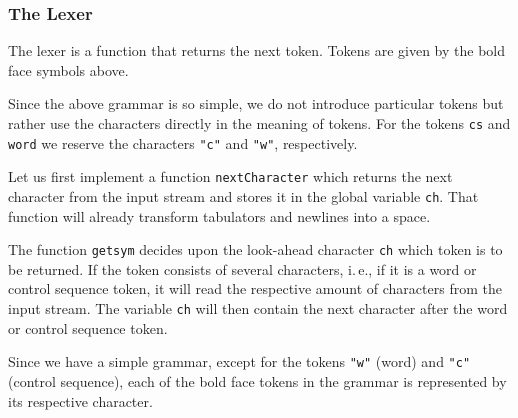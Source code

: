 \documentclass[a4paper]{article} %
\newcommand{\ie}{i.\,e.}
\begin{document}
\subsubsection{The Lexer}
The lexer is a function that returns the next token. Tokens are given
by the bold face symbols above.

Since the above grammar is so simple, we do not introduce particular
tokens but rather use the characters directly in the meaning of
tokens. For the tokens \texttt{cs} and \texttt{word} we reserve the
characters \texttt{"c"} and \texttt{"w"}, respectively.

Let us first implement a function \texttt{nextCharacter} which returns
the next character from the input stream and stores it in the global
variable \texttt{ch}. That function will already transform tabulators and
newlines into a space.


The function \texttt{getsym} decides upon the look-ahead character
\texttt{ch} which token is to be returned. If the token consists of
several characters, \ie, if it is a word or control sequence token, it
will read the respective amount of characters from the input stream.
The variable \texttt{ch} will then contain the next character after
the word or control sequence token.

Since we have a simple grammar, except for the tokens \verb|"w"|
(word) and \verb|"c"| (control sequence), each of the bold face
tokens in the grammar is represented by its respective character.
\end{document}
